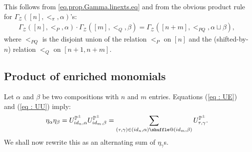 \documentclass[numbers=enddot,12pt,final,onecolumn,notitlepage]{scrartcl}%
\makeatletter
\newcommand{\al}{\alpha}
\newcommand{\PP}{\mathbb{P}} %
\providecommand*{\shuffle}{%
  \mathbin{\mathpalette\shuffle@{}}%
}
\newcommand*{\shuffle@}[2]{%
  \sbox0{$#1\vcenter{}$}%
  \kern .15\ht0 %
  \rlap{\vrule height .25\ht0 depth 0pt width 2.5\ht0}%
  \raise.1\ht0\hbox to 2.5\ht0{%
    \vrule height 1.75\ht0 depth -.1\ht0 width .17\ht0 %
    \hfill
    \vrule height 1.75\ht0 depth -.1\ht0 width .17\ht0 %
    \hfill
    \vrule height 1.75\ht0 depth -.1\ht0 width .17\ht0 %
  }%
  \kern .15\ht0 %
}
\newcommand{\0}{\phantom{c}}
\let\sumnonlimits\sum
\renewcommand{\sum}{\sumnonlimits\limits}
\makeatother
\begin{document}
This follows from \eqref{eq.prop.Gamma.linexts.eq} and from the obvious product rule for $\Gamma_\mathcal{Z}([n],<_\pi, \alpha)$'s:
\begin{align}
\Gamma_\mathcal{Z}([n],<_P, \alpha) \cdot \Gamma_\mathcal{Z}([m],<_Q, \beta)
= \Gamma_\mathcal{Z}([n+m],<_{PQ}, \alpha \sqcup \beta),
\label{eq.Gamma.product}
\end{align}
where $<_{PQ}$ is the disjoint union of the relation $<_P$ on $[n]$ and the (shifted-by-$n$) relation $<_Q$ on $[n+1, n+m]$.


\subsection{Product of  enriched monomials}
Let $\alpha$ and $\beta$ be two compositions with $n$ and $m$ entries. Equations (\ref{eq : UE}) and (\ref{eq : UU}) imply:
\begin{align}
\label{eq : MME}
\eta_\al \eta_\beta = U^{\PP^\pm}_{id_{n},\alpha}U^{\PP^\pm}_{id_{m},\beta}=\sum_{(\tau,\gamma)\in(id_{n},\alpha)\shuffle(id_{m},\beta)}U^{\mathcal{\PP^\pm}}_{\tau,\gamma} .
\end{align}
We shall now rewrite this as an alternating sum of $\eta_\gamma$s.
\end{document}
